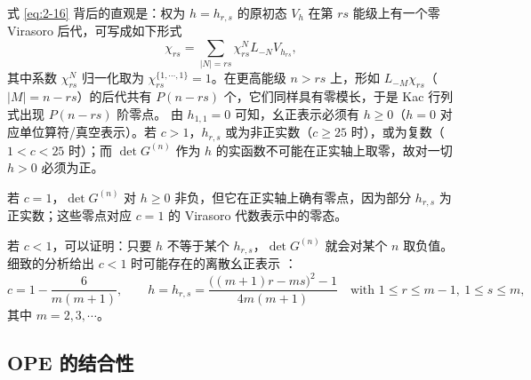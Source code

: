 式 \eqref{eq:2-16} 背后的直观是：权为 $h=h_{r,s}$ 的原初态 $V_h$ 在第 $rs$ 能级上有一个零 Virasoro 后代，可写成如下形式
\begin{equation}
  \label{eq:2-19}
  \chi_{rs} = \sum_{|N|=rs}\chi_{rs}^{N}L_{-N}V_{h_{rs}},
\end{equation}
其中系数 $\chi_{rs}^{N}$ 归一化取为 $\chi_{rs}^{\{1,\cdots,1\}}=1$。在更高能级 $n>rs$ 上，形如 $L_{-M}\chi_{rs}$（$|M|=n-rs$）的后代共有 $P(n-rs)$ 个，它们同样具有零模长，于是 Kac 行列式出现 $P(n-rs)$ 阶零点。
由 $h_{1,1}=0$ 可知，幺正表示必须有 $h\ge 0$（$h=0$ 对应单位算符/真空表示）。若 $c>1$，$h_{r,s}$ 或为非正实数（$c\ge 25$ 时），或为复数（$1<c<25$ 时）；而 $\det G^{(n)}$ 作为 $h$ 的实函数不可能在正实轴上取零，故对一切 $h>0$ 必须为正。

若 $c=1$，$\det G^{(n)}$ 对 $h\ge 0$ 非负，但它在正实轴上确有零点，因为部分 $h_{r,s}$ 为正实数；这些零点对应 $c=1$ 的 Virasoro 代数表示中的零态。

若 $c<1$，可以证明：只要 $h$ 不等于某个 $h_{r,s}$，$\det G^{(n)}$ 就会对某个 $n$ 取负值。细致的分析给出 $c<1$ 时可能存在的离散幺正表示 \cite{r4,r5}：
\begin{equation}
  \label{eq:2-20}
  c = 1-\frac{6}{m(m+1)},\qquad
  h = h_{r,s} = \frac{\bigl((m+1)r-ms\bigr)^2-1}{4m(m+1)}
  \quad\text{with } 1\le r\le m-1,\ 1\le s\le m,
\end{equation}
其中 $m=2,3,\cdots$。

\subsection{OPE 的结合性}

